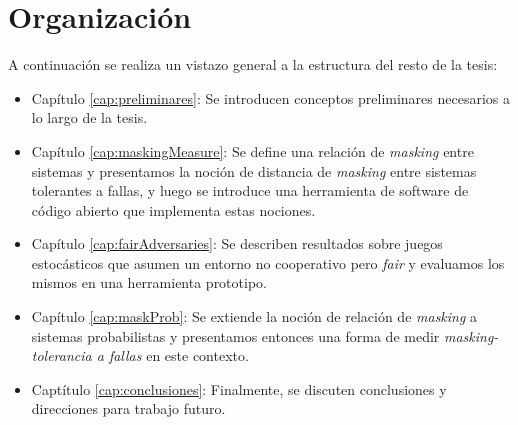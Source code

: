 \section{Organización}
\label{sec:intro.organizacion}
A continuación se realiza un vistazo general a la estructura del resto de la tesis:
\begin{itemize}
	
\item Capítulo \ref{cap:preliminares}: Se introducen conceptos preliminares necesarios a lo largo de la tesis.
\item Capítulo \ref{cap:maskingMeasure}: Se define una relación de \textit{masking} entre sistemas y presentamos la noción de distancia de \textit{masking} entre sistemas tolerantes a fallas, y luego se introduce una herramienta de software de código abierto que implementa estas nociones.
\item Capítulo \ref{cap:fairAdversaries}: Se describen resultados sobre juegos estocásticos que asumen un entorno no cooperativo pero \textit{fair} y evaluamos los mismos en una herramienta prototipo.
\item Capítulo \ref{cap:maskProb}: Se extiende la noción de relación de \textit{masking} a sistemas probabilistas y presentamos entonces una forma de medir \textit{masking-tolerancia a fallas} en este contexto.
\item Captítulo \ref{cap:conclusiones}: Finalmente, se discuten conclusiones y direcciones para trabajo futuro.
\end{itemize}


